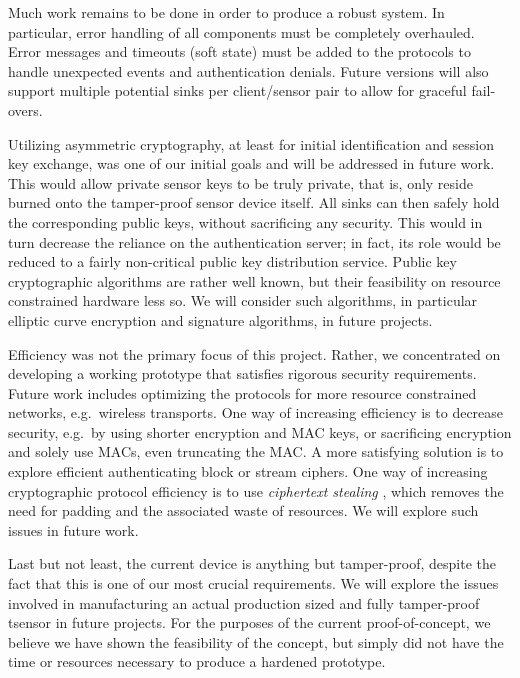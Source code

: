 


%
%

Much work remains to be done in order to produce a robust system. In particular, error handling of all components must be completely overhauled. Error messages and timeouts (soft state) must be added to the protocols to handle unexpected events and authentication denials. Future versions will also support multiple potential sinks per client/sensor pair to allow for graceful fail-overs.


Utilizing asymmetric cryptography, at least for initial identification and session key exchange, was one of our initial goals and will be addressed in future work. This would allow private sensor keys to be truly private, that is, only reside burned onto the tamper-proof sensor device itself. All sinks can then safely hold the corresponding public keys, without sacrificing any security. This would in turn decrease the reliance on the authentication server; in fact, its role would be reduced to a fairly non-critical public key distribution service. Public key cryptographic algorithms are rather well known, but their feasibility on resource constrained hardware less so. We will consider such algorithms, in particular elliptic curve encryption and signature algorithms, in future projects.

Efficiency was not the primary focus of this project. Rather, we concentrated on developing a working prototype that satisfies rigorous security requirements. Future work includes optimizing the protocols for more resource constrained networks, e.g.\ wireless transports. One way of increasing efficiency is to decrease security, e.g.\ by using shorter encryption and MAC keys, or sacrificing encryption and solely use MACs, even truncating the MAC. A more satisfying solution is to explore efficient authenticating block or stream ciphers. One way of increasing cryptographic protocol efficiency is to use \textit{ciphertext stealing} , which removes the need for padding and the associated waste of resources. We will explore such issues in future work.

Last but not least, the current device is anything but tamper-proof, despite the fact that this is one of our most crucial requirements. We will explore the issues involved in manufacturing an actual production sized and fully tamper-proof tsensor in future projects. For the purposes of the current proof-of-concept, we believe we have shown the feasibility of the concept, but simply did not have the time or resources necessary to produce a hardened prototype.

